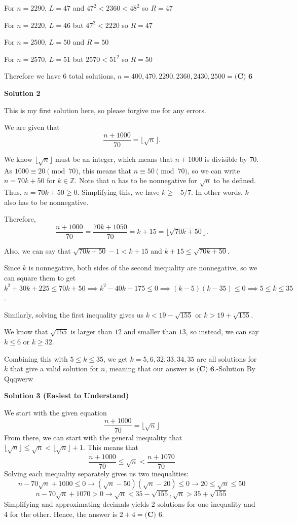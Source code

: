 \begin{enumerate}
 For $n = 2290$,  $L=47$ and $47^2 < 2360 < 48^2$ so  $R=47$

 For $n = 2220$, $L=46$ but $47^2 < 2220$ so  $R=47$

 For $n = 2500$,  $L=50$ and $R=50$

 For $n = 2570$, $L=51$ but $2570 < 51^2$ so $R=50$

 Therefore we have 6 total solutions, $n = 400, 470, 2290, 2360, 2430, 2500 = \boxed{\textbf{(C) 6}}$




\textbf{Solution 2}

This is my first solution here, so please forgive me for any errors.

 We are given that 
 \[\frac{n+1000}{70}=\lfloor\sqrt{n}\rfloor.\]

 We know $\lfloor\sqrt{n}\rfloor$ must be an integer, which means that $n+1000$ is divisible by $70$. As $1000\equiv 20\pmod{70}$, this means that $n\equiv 50\pmod{70}$, so we can write $n=70k+50$ for $k\in\mathbb{Z}$. Note that $n$ has to be nonnegative for $\sqrt{n}$ to be defined. Thus, $n = 70k + 50 \geq 0$. Simplifying this, we have $k \geq -5/7$. In other words, $k$ also has to be nonnegative.

 Therefore, 
 \[\frac{n+1000}{70}=\frac{70k+1050}{70}=k+15=\lfloor\sqrt{70k+50}\rfloor.\]

 Also, we can say that $\sqrt{70k+50}-1 < k+15$ and $k+15\leq\sqrt{70k+50}.$

 Since $k$ is nonnegative, both sides of the second inequality are nonnegative, so we can square them to get $k^{2}+30k+225\leq70k+50\implies k^{2}-40k+175\leq 0\implies (k-5)(k-35)\leq0\implies 5\leq k\leq 35$.

 Similarly, solving the first inequality gives us $k < 19-\sqrt{155}$ or $k > 19+\sqrt{155}.$

 We know that $\sqrt{155}$ is larger than $12$ and smaller than $13$, so instead, we can say $k\leq 6$ or $k\geq 32$.

 Combining this with $5\leq k\leq 35$, we get $k=5,6,32,33,34,35$ are all solutions for $k$ that give a valid solution for $n$, meaning that our answer is $\boxed{\textbf{(C) 6}}$.-Solution By Qqqwerw

 



\textbf{Solution 3 (Easiest to Understand)}

We start with the given equation
 \[\dfrac{n+1000}{70} = \lfloor \sqrt{n} \rfloor\]From there, we can start with the general inequality that $\lfloor \sqrt{n} \rfloor \leq \sqrt{n} < \lfloor \sqrt{n} \rfloor + 1$. This means that
 \[\dfrac{n+1000}{70} \leq \sqrt{n} < \dfrac{n+1070}{70}\]Solving each inequality separately gives us two inequalities:
 \[n - 70\sqrt{n} +1000 \leq 0 \rightarrow (\sqrt{n}-50)(\sqrt{n}-20)\leq 0 \rightarrow 20\leq \sqrt{n} \leq 50\]
 \[n-70\sqrt{n}+1070 > 0 \rightarrow \sqrt{n} < 35-\sqrt{155} , \sqrt{n} > 35+\sqrt{155}\]Simplifying and approximating decimals yields 2 solutions for one inequality and 4 for the other. Hence, the answer is $2+4 = \boxed{\textbf{(C) } 6}$.


\end{enumerate}
